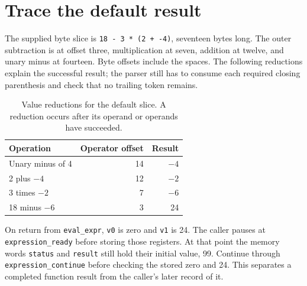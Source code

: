 \section{Trace the default result}\label{expression-trace}
The supplied byte slice is \texttt{18 - 3 * (2 + -4)}, seventeen bytes long.
The outer subtraction is at offset three, multiplication at seven, addition at
twelve, and unary minus at fourteen. Byte offsets include the spaces. The following
reductions explain the successful result; the parser still has to consume each
required closing parenthesis and check that no trailing token remains.

\begin{table}[htbp]
  \centering
  \caption{Value reductions for the default slice. A reduction occurs after its operand or operands have succeeded.}
  \begin{tabular}{lrr}
    \toprule
    Operation        & Operator offset & Result \\
    \midrule
    Unary minus of 4 & 14              & $-4$   \\
    2 plus $-4$      & 12              & $-2$   \\
    3 times $-2$     & 7               & $-6$   \\
    18 minus $-6$    & 3               & 24     \\
    \bottomrule
  \end{tabular}
\end{table}
On return from \texttt{eval\_expr}, \texttt{v0} is zero and \texttt{v1} is 24.
The caller pauses at \texttt{expression\_ready} before storing those registers.
At that point the memory words \texttt{status} and \texttt{result} still hold their
initial value, 99. Continue through \texttt{expression\_continue} before checking
the stored zero and 24. This separates a completed function result from the caller's
later record of it.
